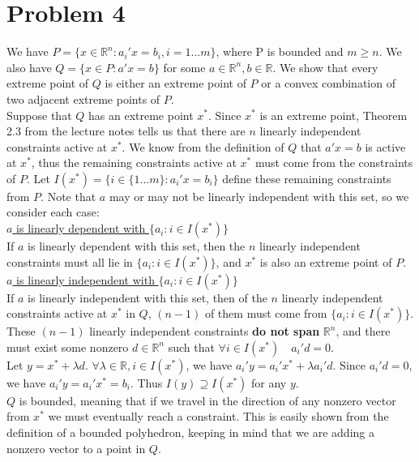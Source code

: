 \documentclass[11pt]{article}
\begin{document}
\section*{Problem 4}

We have $P=\{x\in\mathbb{R}^n: a_i'x=b_i, i=1...m\}$, where P is bounded and $m\geq n$. We also have $Q=\{x\in P: a'x=b\}$ for some $a\in\mathbb{R}^n, b\in\mathbb{R}$. We show that every extreme point of $Q$ is either an extreme point of $P$ or a convex combination of two adjacent extreme points of $P$.\\

Suppose that $Q$ has an extreme point $x^*$. Since $x^*$ is an extreme point, Theorem 2.3 from the lecture notes tells us that there are $n$ linearly independent constraints active at $x^*$. We know from the definition of $Q$ that $a'x=b$ is active at $x^*$, thus the remaining constraints active at $x^*$ must come from the constraints of $P$. Let $I(x^*)=\{i\in\{1...m\}:a_i'x=b_i\}$ define these remaining constraints from $P$. Note that $a$ may or may not be linearly independent with this set, so we consider each case:\\

\underline{$a$ is linearly dependent with $\{a_i:i\in I(x^*)\}$}\\

If $a$ is linearly dependent with this set, then the $n$ linearly independent constraints must all lie in $\{a_i:i\in I(x^*)\}$, and $x^*$ is also an extreme point of $P$.\\

\underline{$a$ is linearly independent with $\{a_i:i\in I(x^*)\}$}\\

If $a$ is linearly independent with this set, then of the $n$ linearly independent constraints active at $x^*$ in $Q$, $(n-1)$ of them must come from  $\{a_i:i\in I(x^*)\}$. These $(n-1)$ linearly independent constraints \textbf{do not span} $\mathbb{R}^n$, and there must exist some nonzero $d\in\mathbb{R}^n$ such that $\forall i\in I(x^*)\quad a_i'd=0$.\\

Let $y=x^*+\lambda d$. $\forall \lambda\in\mathbb{R}, i\in I(x^*)$, we have $a_i'y=a_i'x^*+\lambda a_i'd$. Since $a_i'd=0$, we have $a_i'y = a_i'x^*=b_i$. Thus $I(y)\supseteq I(x^*)$ for any $y$. \\

$Q$ is bounded, meaning that if we travel in the direction of any nonzero vector from $x^*$ we must eventually reach a constraint. This is easily shown from the definition of a bounded polyhedron, keeping in mind that we are adding a nonzero vector to a point in $Q$.\\
\end{document}

